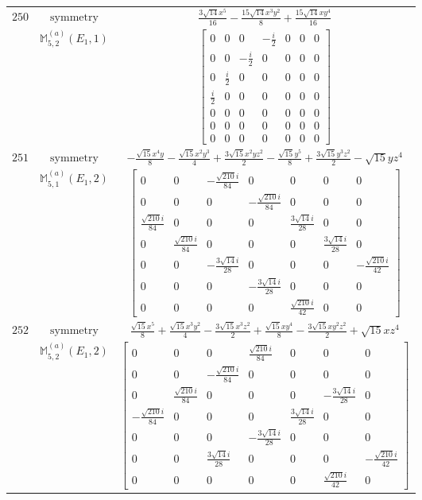 \documentclass[fleqn,8pt,landscape]{jsarticle}
\begin{document}
\begin{longtable}{ccc}
$ 250 $ & $ \text{symmetry} $ & $ \frac{3 \sqrt{14} x^{5}}{16} - \frac{15 \sqrt{14} x^{3} y^{2}}{8} + \frac{15 \sqrt{14} x y^{4}}{16} $ \\
$  $ & $ \mathbb{M}_{5,2}^{(a)}(E_{1},1) $ & $ \begin{bmatrix} 0 & 0 & 0 & - \frac{i}{2} & 0 & 0 & 0 \\ 0 & 0 & - \frac{i}{2} & 0 & 0 & 0 & 0 \\ 0 & \frac{i}{2} & 0 & 0 & 0 & 0 & 0 \\ \frac{i}{2} & 0 & 0 & 0 & 0 & 0 & 0 \\ 0 & 0 & 0 & 0 & 0 & 0 & 0 \\ 0 & 0 & 0 & 0 & 0 & 0 & 0 \\ 0 & 0 & 0 & 0 & 0 & 0 & 0 \end{bmatrix} $ \\ \hline
$ 251 $ & $ \text{symmetry} $ & $ - \frac{\sqrt{15} x^{4} y}{8} - \frac{\sqrt{15} x^{2} y^{3}}{4} + \frac{3 \sqrt{15} x^{2} y z^{2}}{2} - \frac{\sqrt{15} y^{5}}{8} + \frac{3 \sqrt{15} y^{3} z^{2}}{2} - \sqrt{15} y z^{4} $ \\
$  $ & $ \mathbb{M}_{5,1}^{(a)}(E_{1},2) $ & $ \begin{bmatrix} 0 & 0 & - \frac{\sqrt{210} i}{84} & 0 & 0 & 0 & 0 \\ 0 & 0 & 0 & - \frac{\sqrt{210} i}{84} & 0 & 0 & 0 \\ \frac{\sqrt{210} i}{84} & 0 & 0 & 0 & \frac{3 \sqrt{14} i}{28} & 0 & 0 \\ 0 & \frac{\sqrt{210} i}{84} & 0 & 0 & 0 & \frac{3 \sqrt{14} i}{28} & 0 \\ 0 & 0 & - \frac{3 \sqrt{14} i}{28} & 0 & 0 & 0 & - \frac{\sqrt{210} i}{42} \\ 0 & 0 & 0 & - \frac{3 \sqrt{14} i}{28} & 0 & 0 & 0 \\ 0 & 0 & 0 & 0 & \frac{\sqrt{210} i}{42} & 0 & 0 \end{bmatrix} $ \\ \hline
$ 252 $ & $ \text{symmetry} $ & $ \frac{\sqrt{15} x^{5}}{8} + \frac{\sqrt{15} x^{3} y^{2}}{4} - \frac{3 \sqrt{15} x^{3} z^{2}}{2} + \frac{\sqrt{15} x y^{4}}{8} - \frac{3 \sqrt{15} x y^{2} z^{2}}{2} + \sqrt{15} x z^{4} $ \\
$  $ & $ \mathbb{M}_{5,2}^{(a)}(E_{1},2) $ & $ \begin{bmatrix} 0 & 0 & 0 & \frac{\sqrt{210} i}{84} & 0 & 0 & 0 \\ 0 & 0 & - \frac{\sqrt{210} i}{84} & 0 & 0 & 0 & 0 \\ 0 & \frac{\sqrt{210} i}{84} & 0 & 0 & 0 & - \frac{3 \sqrt{14} i}{28} & 0 \\ - \frac{\sqrt{210} i}{84} & 0 & 0 & 0 & \frac{3 \sqrt{14} i}{28} & 0 & 0 \\ 0 & 0 & 0 & - \frac{3 \sqrt{14} i}{28} & 0 & 0 & 0 \\ 0 & 0 & \frac{3 \sqrt{14} i}{28} & 0 & 0 & 0 & - \frac{\sqrt{210} i}{42} \\ 0 & 0 & 0 & 0 & 0 & \frac{\sqrt{210} i}{42} & 0 \end{bmatrix} $ \\ \hline

\end{longtable}
\end{document}
